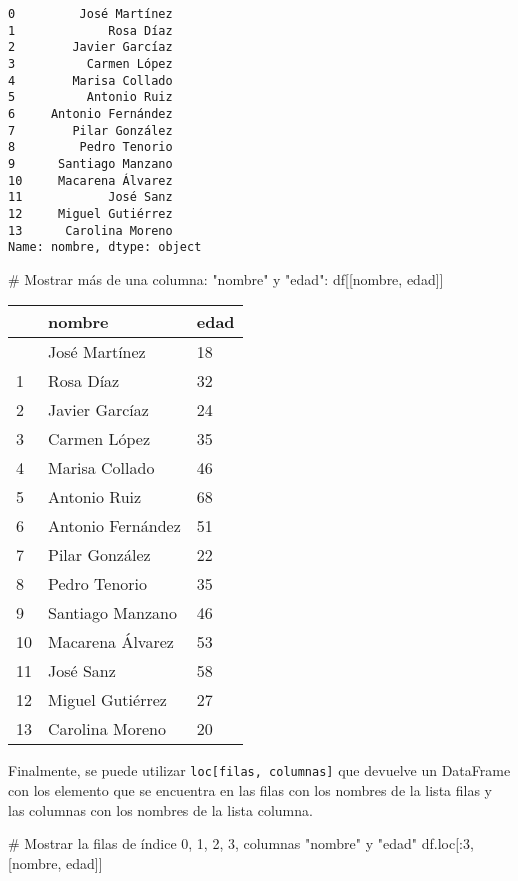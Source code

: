 \documentclass[
  letterpaper,
  DIV=11,
  numbers=noendperiod]{scrreprt}
\newenvironment{Shaded}{\begin{snugshade}}{\end{snugshade}}
\newcommand{\CommentTok}[1]{\textcolor[rgb]{0.37,0.37,0.37}{#1}}
\newcommand{\DecValTok}[1]{\textcolor[rgb]{0.68,0.00,0.00}{#1}}
\newcommand{\NormalTok}[1]{\textcolor[rgb]{0.00,0.23,0.31}{#1}}
\newcommand{\StringTok}[1]{\textcolor[rgb]{0.13,0.47,0.30}{#1}}
\begin{document}
\begin{verbatim}
0         José Martínez
1             Rosa Díaz
2        Javier Garcíaz
3          Carmen López
4        Marisa Collado
5          Antonio Ruiz
6     Antonio Fernández
7        Pilar González
8         Pedro Tenorio
9      Santiago Manzano
10     Macarena Álvarez
11            José Sanz
12     Miguel Gutiérrez
13      Carolina Moreno
Name: nombre, dtype: object
\end{verbatim}

\begin{Shaded}
\begin{Highlighting}[]
\CommentTok{\# Mostrar más de una columna: "nombre" y "edad":}
\NormalTok{df[[}\StringTok{\textquotesingle{}nombre\textquotesingle{}}\NormalTok{, }\StringTok{\textquotesingle{}edad\textquotesingle{}}\NormalTok{]]}
\end{Highlighting}
\end{Shaded}

\begin{longtable}[]{@{}lll@{}}
\toprule\noalign{}
& nombre & edad \\
\midrule\noalign{}
\endhead
\bottomrule\noalign{}
\endlastfoot
0 & José Martínez & 18 \\
1 & Rosa Díaz & 32 \\
2 & Javier Garcíaz & 24 \\
3 & Carmen López & 35 \\
4 & Marisa Collado & 46 \\
5 & Antonio Ruiz & 68 \\
6 & Antonio Fernández & 51 \\
7 & Pilar González & 22 \\
8 & Pedro Tenorio & 35 \\
9 & Santiago Manzano & 46 \\
10 & Macarena Álvarez & 53 \\
11 & José Sanz & 58 \\
12 & Miguel Gutiérrez & 27 \\
13 & Carolina Moreno & 20 \\
\end{longtable}

Finalmente, se puede utilizar \texttt{loc{[}filas,\ columnas{]}} que
devuelve un DataFrame con los elemento que se encuentra en las filas con
los nombres de la lista filas y las columnas con los nombres de la lista
columna.

\begin{Shaded}
\begin{Highlighting}[]
\CommentTok{\# Mostrar la filas de índice 0, 1, 2, 3, columnas "nombre" y "edad"}
\NormalTok{df.loc[:}\DecValTok{3}\NormalTok{, [}\StringTok{\textquotesingle{}nombre\textquotesingle{}}\NormalTok{, }\StringTok{\textquotesingle{}edad\textquotesingle{}}\NormalTok{]]}
\end{Highlighting}
\end{Shaded}
\end{document}
